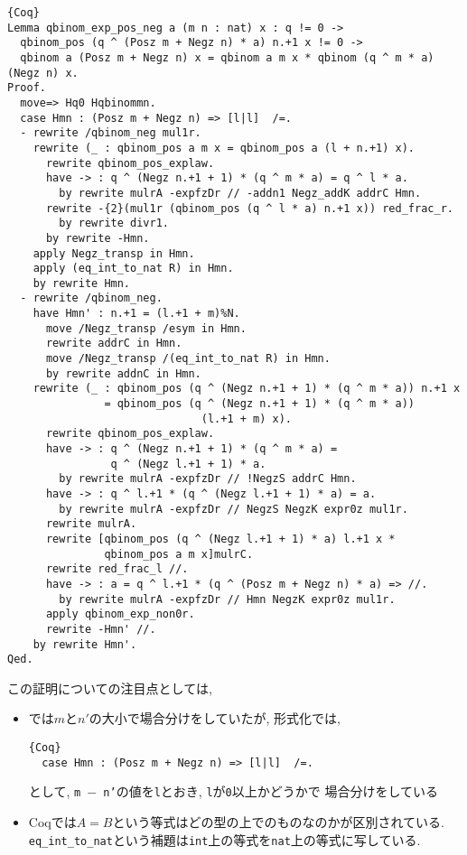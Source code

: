 \documentclass[11pt]{jarticle}
\theoremstyle{mystyle}
\newcommand{\0}{\textbf{0}}
\newcommand{\1}{\textbf{1}}
\newcommand{\2}{\textbf{2}}
\begin{document}
\begin{lstlisting}{Coq}
Lemma qbinom_exp_pos_neg a (m n : nat) x : q != 0 ->
  qbinom_pos (q ^ (Posz m + Negz n) * a) n.+1 x != 0 ->
  qbinom a (Posz m + Negz n) x = qbinom a m x * qbinom (q ^ m * a) (Negz n) x.
Proof.
  move=> Hq0 Hqbinommn.
  case Hmn : (Posz m + Negz n) => [l|l]  /=.
  - rewrite /qbinom_neg mul1r.
    rewrite (_ : qbinom_pos a m x = qbinom_pos a (l + n.+1) x).
      rewrite qbinom_pos_explaw.
      have -> : q ^ (Negz n.+1 + 1) * (q ^ m * a) = q ^ l * a.
        by rewrite mulrA -expfzDr // -addn1 Negz_addK addrC Hmn.
      rewrite -{2}(mul1r (qbinom_pos (q ^ l * a) n.+1 x)) red_frac_r.
        by rewrite divr1.
      by rewrite -Hmn.
    apply Negz_transp in Hmn.
    apply (eq_int_to_nat R) in Hmn.
    by rewrite Hmn.
  - rewrite /qbinom_neg.
    have Hmn' : n.+1 = (l.+1 + m)%N.
      move /Negz_transp /esym in Hmn.
      rewrite addrC in Hmn.
      move /Negz_transp /(eq_int_to_nat R) in Hmn.
      by rewrite addnC in Hmn.
    rewrite (_ : qbinom_pos (q ^ (Negz n.+1 + 1) * (q ^ m * a)) n.+1 x 
               = qbinom_pos (q ^ (Negz n.+1 + 1) * (q ^ m * a))
                              (l.+1 + m) x).
      rewrite qbinom_pos_explaw.
      have -> : q ^ (Negz n.+1 + 1) * (q ^ m * a) =
                q ^ (Negz l.+1 + 1) * a.
        by rewrite mulrA -expfzDr // !NegzS addrC Hmn.
      have -> : q ^ l.+1 * (q ^ (Negz l.+1 + 1) * a) = a.
        by rewrite mulrA -expfzDr // NegzS NegzK expr0z mul1r.
      rewrite mulrA.
      rewrite [qbinom_pos (q ^ (Negz l.+1 + 1) * a) l.+1 x *
               qbinom_pos a m x]mulrC.
      rewrite red_frac_l //.
      have -> : a = q ^ l.+1 * (q ^ (Posz m + Negz n) * a) => //.
        by rewrite mulrA -expfzDr // Hmn NegzK expr0z mul1r.
      apply qbinom_exp_non0r.
      rewrite -Hmn' //.
    by rewrite Hmn'.
Qed.
\end{lstlisting}
この証明についての注目点としては, 
\begin{itemize}
  \item \cite{Kac}では$m$と$n'$の大小で場合分けをしていたが, 形式化では, 
           \begin{lstlisting}{Coq}
  case Hmn : (Posz m + Negz n) => [l|l]  /=. \end{lstlisting}
           として, {\tt m $-$ n'}の値を{\tt l}とおき, {\tt l}が{\tt 0}以上かどうかで
           場合分けをしている
  \item Coqでは$A = B$という等式はどの型の上でのものなのかが区別されている. 
           {\tt eq\_int\_to\_nat}という補題は{\tt int}上の等式を{\tt nat}上の等式に写している. 
\end{itemize}
\end{document}
